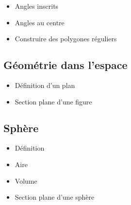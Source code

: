 \begin{itemize}
	\item Angles inscrits
	\item Angles au centre
	\item Construire des polygones réguliers
\end{itemize}

\subsection{Géométrie dans l'espace}

\begin{itemize}
	\item Définition d'un plan
	\item Section plane d'une figure
\end{itemize}

\subsection{Sphère}

\begin{itemize}
	\item Définition
	\item Aire
	\item Volume
	\item Section plane d'une sphère
\end{itemize}